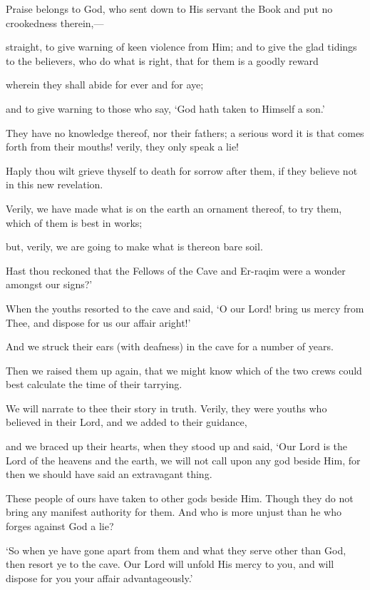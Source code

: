 \documentclass[fontsize=14pt, letterpaper, notitlepage, openany, DIV=12]{scrbook} %
\begin{document}
\noindent[18:1]
Praise belongs to God, who sent down to His servant the Book and put no crookedness
therein,---

\noindent[18:2]
straight, to give warning of keen violence from Him; and to give the glad tidings to the
believers, who do what is right, that for them is a goodly reward

\noindent[18:3]
wherein they shall abide for ever and for aye;

\noindent[18:4]
and to give warning to those who say, `God hath taken to Himself a son.'

\noindent[18:5]
They have no knowledge thereof, nor their fathers; a serious word it is that comes forth
from their mouths! verily, they only speak a lie!

\noindent[18:6]
Haply thou wilt grieve thyself to death for sorrow after them, if they believe not in this
new revelation.

\noindent[18:7]
Verily, we have made what is on the earth an ornament thereof, to try them, which of
them is best in works;

\noindent[18:8]
but, verily, we are going to make what is thereon bare soil.

\noindent[18:9]
Hast thou reckoned that the Fellows of the Cave and Er-raqim were a wonder amongst
our signs?'

\noindent[18:10]
When the youths resorted to the cave and said, `O our Lord! bring us mercy from Thee,
and dispose for us our affair aright!'

\noindent[18:11]
And we struck their ears (with deafness) in the cave for a number of years.

\noindent[18:12]
Then we raised them up again, that we might know which of the two crews could best
calculate the time of their tarrying.

\noindent[18:13]
We will narrate to thee their story in truth. Verily, they were youths who believed in their
Lord, and we added to their guidance,

\noindent[18:14]
and we braced up their hearts, when they stood up and said, `Our Lord is the Lord of the
heavens and the earth, we will not call upon any god beside Him, for then we should have said
an extravagant thing.

\noindent[18:15]
These people of ours have taken to other gods beside Him. Though they do not bring any
manifest authority for them. And who is more unjust than he who forges against God a lie?

\noindent[18:16]
`So when ye have gone apart from them and what they serve other than God, then resort
ye to the cave. Our Lord will unfold His mercy to you, and will dispose for you your affair
advantageously.'
\end{document}
